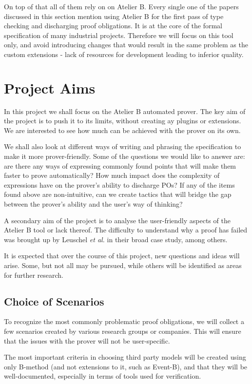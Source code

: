 \documentclass[11pt,journal]{IEEEtran}
\begin{document}
	On top of that all of them rely on on Atelier B. Every single one of the papers discussed in this section mention using Atelier B for the first pass of type checking and discharging proof obligations. It is at the core of the formal specification of many industrial projects. Therefore we will focus on this tool only, and avoid introducing changes that would result in the same problem as the custom extensions - lack of resources for development leading to inferior quality.
	
	
	
	\section{Project Aims}
	In this project we shall focus on the Atelier B automated prover. The key aim of the project is to push it to its limits, without creating ay plugins or extensions. We are interested to see how much can be achieved with the prover on its own.
	
	We shall also look at different ways of writing and phrasing the specification to make it more prover-friendly. Some of the questions we would like to answer are: are there any ways of expressing commonly found points that will make them faster to prove automatically? How much impact does the complexity of expressions have on the prover's ability to discharge POs? If any of the items found above are non-intuitive, can we create tactics that will bridge the gap between the prover's ability and the user's way of thinking?
	
	A secondary aim of the project is to analyse the user-friendly aspects of the Atelier B tool or lack thereof. The difficulty to understand why a proof has failed was brought up by Leuschel \emph{et al.} in their broad case study\cite{San Juan metro}, among others. 
	
	It is expected that over the course of this project, new questions and ideas will arise. Some, but not all may be pursued, while others will be identified as areas for further research.
	
	\subsection{Choice of Scenarios}
	To recognize the most commonly problematic proof obligations, we will collect a few scenarios created by various research groups or companies. This will ensure that the issues with the prover will not be user-specific. 
	
	The most important criteria in choosing third party models will be created using only B-method (and not extensions to it, such as Event-B), and that they will be well-documented, especially in terms of tools used for verification.
	
\end{document}
